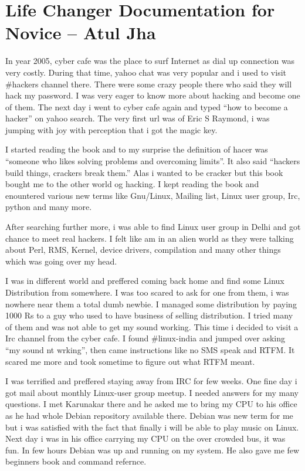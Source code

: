 \chapter{Life Changer Documentation for Novice -- Atul Jha}
In year 2005, cyber cafe was the place to surf Internet as dial up connection
was very costly. During that time, yahoo chat was very popular and i used to
visit \#hackers channel there. There were some crazy people there who said they
will hack my password. I was very eager to know more about hacking and become
one of them. The next day i went to cyber cafe again and typed “how to become a
hacker” on yahoo search. The very first url was of Eric S Raymond, i was jumping
with joy with perception that i got the magic key.
 
I started reading the book and to my surprise the definition of hacer was
“someone who likes solving problems and overcoming limits”. It also said
“hackers build things, crackers break them.”  Alas i wanted to be cracker but
this book bought me to the other world og hacking. I kept reading the book and
enountered various new terms like Gnu/Linux, Mailing list, Linux user group,
Irc, python and many more. 

After searching further more, i was able to find Linux user group in Delhi and
got chance to meet real hackers. I felt like am in an alien world as they were
talking about Perl, RMS, Kernel, device drivers, compilation and many other
things which was going over my head.  

I was in different world and preffered coming back home and find some Linux
Distribution from somewhere. I was too scared to ask for one from them, i was
nowhere near them a total dumb newbie. I managed some distribution by paying
1000 Rs to a guy who used to have business of selling distribution. I tried many
of them and was not able to get my sound working. This time i decided to visit a
Irc channel from the cyber cafe. I found \#linux-india and jumped over asking
“my sound nt wrking”, then came instructions like no SMS speak and RTFM. It
scared me more and took sometime to figure out what RTFM meant. 

I was terrified and preffered staying away from IRC for few weeks. One fine day
i got mail about monthly Linux-user group meetup. I needed answers for my many
questions. I met Karunakar there and he asked me to bring my CPU to his office
as he had whole Debian repository available there. Debian was new term for me
but i was satisfied with the fact that finally i will be able to play music  on
Linux.  Next day i was in his office carrying my CPU on the over crowded bus, it
was fun. In few hours Debian was up and running on my system. He also gave me
few beginners book and command refernce. 

